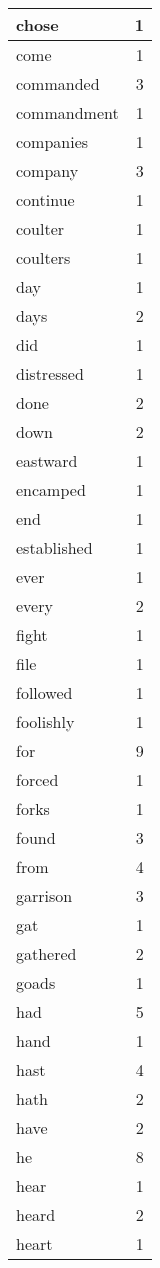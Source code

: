 \begin{center}
\begin{longtable}{l|r}
chose & 1 \\ \hline
come & 1 \\ \hline
commanded & 3 \\ \hline
commandment & 1 \\ \hline
companies & 1 \\ \hline
company & 3 \\ \hline
continue & 1 \\ \hline
coulter & 1 \\ \hline
coulters & 1 \\ \hline
day & 1 \\ \hline
days & 2 \\ \hline
did & 1 \\ \hline
distressed & 1 \\ \hline
done & 2 \\ \hline
down & 2 \\ \hline
eastward & 1 \\ \hline
encamped & 1 \\ \hline
end & 1 \\ \hline
established & 1 \\ \hline
ever & 1 \\ \hline
every & 2 \\ \hline
fight & 1 \\ \hline
file & 1 \\ \hline
followed & 1 \\ \hline
foolishly & 1 \\ \hline
for & 9 \\ \hline
forced & 1 \\ \hline
forks & 1 \\ \hline
found & 3 \\ \hline
from & 4 \\ \hline
garrison & 3 \\ \hline
gat & 1 \\ \hline
gathered & 2 \\ \hline
goads & 1 \\ \hline
had & 5 \\ \hline
hand & 1 \\ \hline
hast & 4 \\ \hline
hath & 2 \\ \hline
have & 2 \\ \hline
he & 8 \\ \hline
hear & 1 \\ \hline
heard & 2 \\ \hline
heart & 1 \\ \hline

\end{longtable}
\end{center}
